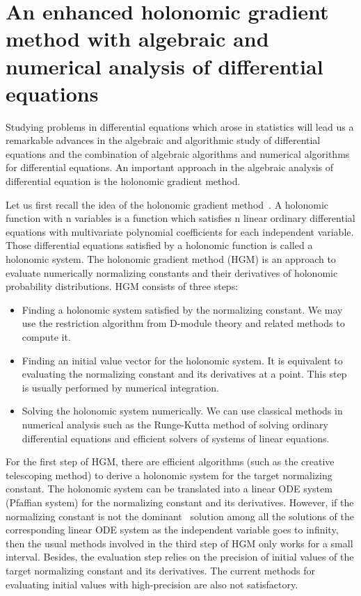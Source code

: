 \documentclass[10pt,a4paper]{article}
\begin{document}
\section*{An enhanced holonomic gradient method with algebraic and numerical analysis of differential equations} \label{SECT:HGM}


Studying problems in differential equations which arose in statistics will lead us a remarkable advances in the algebraic and algorithmic study of differential equations and the combination of algebraic algorithms and numerical algorithms for differential equations. An important approach in the algebraic analysis of differential equation is the holonomic gradient method. 

  Let us first recall the idea of the holonomic gradient method~\cite{Nakayama2011}. A holonomic function with n variables is a function which satisfies n linear ordinary differential equations with multivariate polynomial coefficients for each independent variable. Those differential equations satisfied by a holonomic function is called a holonomic system. The holonomic gradient method (HGM) is an approach to evaluate numerically normalizing constants and their derivatives of holonomic probability distributions. HGM consists of three steps: 
\begin{itemize}
  \item Finding a holonomic system satisfied by the normalizing constant. We may use the restriction algorithm from D-module theory and related methods to compute it. 
  \item Finding an initial value vector for the holonomic system. It is equivalent to evaluating the normalizing constant and its derivatives at a point. This step is usually performed by numerical integration.
  \item Solving the holonomic system numerically. We can use classical methods in numerical analysis such as the Runge-Kutta method of solving ordinary differential equations and efficient solvers of systems of linear equations.
  \end{itemize}

For the first step of HGM, there are efficient algorithms (such as the creative telescoping method) to derive a holonomic system for the target normalizing constant. The holonomic system can be translated into a linear ODE system (Pfaffian system) for the normalizing constant and its derivatives. However, if the normalizing constant is not the dominant~\cite{Danufane2018} solution among all the solutions of the corresponding linear ODE system as the independent variable goes to infinity, then the usual methods involved in the third step of HGM only works for a small interval. Besides, the evaluation step relies on the precision of initial values of the target normalizing constant and its derivatives. The current methods for evaluating initial values with high-precision are also not satisfactory.
  
\end{document}
